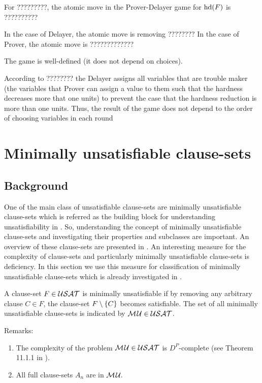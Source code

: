 \documentclass{report}
\begin{document}
\begin{defi}\label{def:atomicmovegraph}
For ?????????, the atomic move in the Prover-Delayer game for $\operatorname{hd}(F)$ is ??????????

In the case of Delayer, the atomic move is removing ????????
In the case of Prover, the atomic move is ?????????????
\end{defi}

\begin{lem}\label{lem:Tseitingame1}
The game is well-defined (it does not depend on choices). 
\end{lem}
\begin{prf}
According to ???????? the Delayer assigns all variables that are trouble maker (the variables that Prover can assign a value to them such that the hardness decreases more that one units) to prevent the case that the hardness reduction is more than one units. Thus, the result of the game does not depend to the order of choosing variables in each round
\end{prf}

\chapter{Minimally unsatisfiable clause-sets}
\label{cha:mucls}

\section{Background}
\label{sec:basicdef}

One of the main class of unsatisfiable clause-sets are minimally unsatisfiable clause-sets which is referred as the building block for understanding unsatisfiability in \cite{h9}. So, understanding the concept of minimally unsatisfiable clause-sets and investigating their properties and subclasses are important. An overview of these clause-sets are presented in \cite{h9, h25,h29}. An interesting measure for the complexity of clause-sets and particularly minimally unsatisfiable clause-sets is deficiency. In this section we use this measure for classification of minimally unsatisfiable clause-sets which is already investigated in \cite{h9, h25,h26,h24, h27}.

\begin{defi}\label{def:mu}
A clause-set $F \in \mathcal{USAT}$ is minimally unsatisfiable if by removing any arbitrary clause $C \in F$, the clause-set $F \setminus \{ C \}$ becomes satisfiable. The set of all minimally unsatisfiable clause-sets is indicated by $\mathcal{M\hspace{0.8pt}U} \in \mathcal{USAT}$.
\end{defi}
Remarks:
  \begin{enumerate}
  \item The complexity of the problem $\mathcal{M\hspace{0.8pt}U} \in \mathcal{USAT}$ is $D^P$-complete (see Theorem 11.1.1 in \cite{h25}).
  \item All full clause-sets $ A_n$ are in $\mathcal{M\hspace{0.8pt}U}_{\!}$.
  \end{enumerate}
\end{document}
